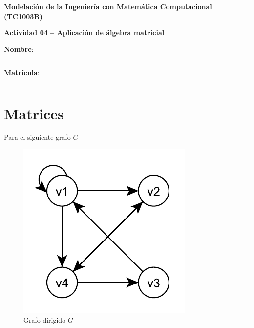 \documentclass[spanish, 10pt]{article}
\begin{document}
\begin{center}
	{\Large \textbf{Modelación de la Ingeniería con Matemática Computacional (TC1003B)}}
	
	\bigskip
	{\large \textbf{Actividad 04 -- Aplicación de álgebra matricial}}
\end{center}

\bigskip
{\large \textbf{Nombre}: \rule{13.7 cm}{0.4mm}}



\bigskip
{\large \textbf{Matrícula}: \rule{5 cm}{0.4mm}} %

\bigskip


\section{Matrices}

Para el siguiente grafo $G$

\begin{figure}[htbp]
    \centering
    \includegraphics{digraph02.pdf}
    \caption{Grafo dirigido $G$}
    \label{fig:digraph}
\end{figure}
\end{document}
